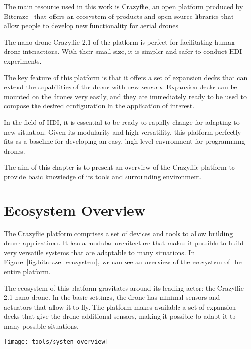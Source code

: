 The main resource used in this work is Crazyflie, an open platform produced by Bitcraze~\cite{bitcraze} 
that offers an ecosystem of products and open-source libraries that allow people to develop new functionality for aerial drones. 

The nano-drone Crazyflie 2.1 of the platform is perfect for facilitating human-drone interactions.
With their small size, it is simpler and safer to conduct HDI experiments. 

The key feature of this platform is that it offers a set of expansion decks that can extend the capabilities of the drone with new sensors. 
Expansion decks can be mounted on the drones very easily, and they are immediately ready to be used to compose the desired configuration in the application of interest.

In the field of HDI, it is essential to be ready to rapidly change for adapting to new situation.
Given its modularity and high versatility, this platform perfectly fits as a baseline for developing an easy, high-level environment for programming drones.

The aim of this chapter is to present an overview of the Crazyflie platform to provide basic knowledge of its tools and surrounding environment.

\section{Ecosystem Overview}\label{sec:ecosystem_oveerview}
The Crazyflie platform comprises a set of devices and tools to allow building drone applications. 
It has a modular architecture that makes it possible to build very versatile systems that are adaptable to many situations. 
In Figure~\ref{fig:bitcraze_ecosystem}, we can see an overview of the ecosystem of the entire platform.

The ecosystem of this platform gravitates around its leading actor: the Crazyflie 2.1 nano drone. 
In the basic settings, the drone has minimal sensors and actuators that allow it to fly. 
The platform makes available a set of expansion decks that give the drone additional sensors, making it possible to adapt it to many possible situations.


\begin{SCfigure}[\sidecaptionrelwidth][tb]
    \texttt{[image: tools/system\_overview]}
    \caption[Bitcraze Ecosystem overview]{This picture represents an overview of the Bitcraze Ecosystem~\cite{bitcraze}}
    \label{fig:bitcraze_ecosystem}
\end{SCfigure}


